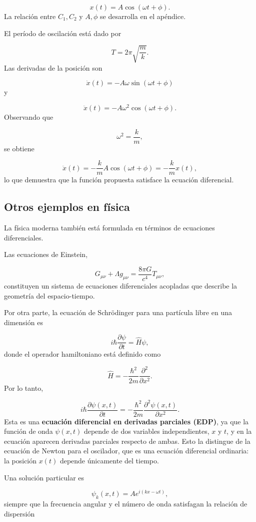 \documentclass[12pt,a4paper]{article}
\begin{document}
	\[
	x(t)=A\cos(\omega t+\phi).
	\]
	La relación entre \(C_1,C_2\) y \(A,\phi\) se desarrolla en el apéndice.
	
	El período de oscilación está dado por
	
	\[
	T=2\pi\sqrt{\frac{m}{k}}.
	\]
	Las derivadas de la posición son
	
	\[
	\dot{x}(t)=-A\omega\sin(\omega t+\phi)
	\]
	y
	
	\[
	\ddot{x}(t)=-A\omega^2\cos(\omega t+\phi).
	\]
	Observando que
	
	\[
	\omega^2=\frac{k}{m},
	\]
	se obtiene
	
	\[
	\ddot{x}(t)
	=-\frac{k}{m}A\cos(\omega t+\phi)
	=-\frac{k}{m}x(t),
	\]
	lo que demuestra que la función propuesta satisface la ecuación diferencial.
	
	\subsection{Otros ejemplos en física}
	
	La física moderna también está formulada en términos de ecuaciones diferenciales.
	
	Las ecuaciones de Einstein,
	
	\[
	G_{\mu\nu}+\Lambda g_{\mu\nu}
	=
	\frac{8\pi G}{c^4}T_{\mu\nu},
	\]
	constituyen un sistema de ecuaciones diferenciales acopladas que describe la geometría del espacio-tiempo.
	
	Por otra parte, la ecuación de Schrödinger para una partícula libre en una dimensión es
	
	\[
	i\hbar\frac{\partial\psi}{\partial t}
	=
	\hat{H}\psi,
	\]
	donde el operador hamiltoniano está definido como
	
	\[
	\hat{H}
	=
	-\frac{\hbar^2}{2m}
	\frac{\partial^2}{\partial x^2}.
	\]
	Por lo tanto,
	
	\[
	i\hbar
	\frac{\partial\psi(x,t)}{\partial t}
	=
	-\frac{\hbar^2}{2m}
	\frac{\partial^2\psi(x,t)}{\partial x^2}.
	\]
	Esta es una \textbf{ecuación diferencial en derivadas parciales (EDP)}, ya que la función de onda \(\psi(x,t)\) depende de dos variables independientes, \(x\) y \(t\), y en la ecuación aparecen derivadas parciales respecto de ambas. Esto la distingue de la ecuación de Newton para el oscilador, que es una ecuación diferencial ordinaria: la posición \(x(t)\) depende únicamente del tiempo.
	
	Una solución particular es
	
	\[
	\psi_k(x,t)
	=
	Ae^{i(kx-\omega t)},
	\]
	siempre que la frecuencia angular y el número de onda satisfagan la relación de dispersión
	
\end{document}
